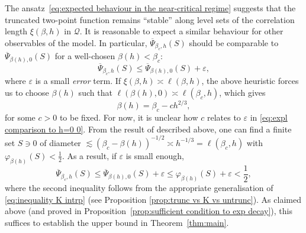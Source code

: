 \documentclass[10pt,a4paper]{amsart}
\numberwithin{equation}{section}
\begin{document}
The ansatz~\eqref{eq:expected behaviour in the near-critical regime} suggests
that the truncated two-point function remains ``stable'' along level sets of
the correlation length $\xi(\beta,h)$ in $\mathcal Q$. It is reasonable to expect a similar behaviour for other 
observables of the model. In particular, $\overline{\Psi}_{\beta_c,h}(S)$ 
should be comparable to $\overline{\Psi}_{\beta(h),0}(S)$ for a 
well-chosen $\beta(h)<\beta_c$:
\begin{equation}\label{eq:expl comparison to h=0 0}
	\overline{\Psi}_{\beta_c,h}(S)\leq \overline{\Psi}_{\beta(h),0}(S)+\varepsilon,
\end{equation}
where $\varepsilon$ is a small \emph{error} term. If $\xi(\beta,h)\asymp \ell(\beta,h)$, the above heuristic forces us to choose $\beta(h)$ such that $\ell(\beta(h),0)\asymp\ell(\beta_c,h)$, which gives
\begin{equation}
    \beta(h)=\beta_c-ch^{2/3},
\end{equation}
for some $c>0$ to be fixed. For now, it is unclear how $c$ relates to $\varepsilon$ in \eqref{eq:expl comparison to h=0 0}. From the result of \cite{DuminilPanis2024newLB} described above, one can find a finite 
set $S\ni 0$ of diameter $\lesssim(\beta_c-\beta(h))^{-1/2}\asymp h^{-1/3}=\ell(\beta_c,h)$ 
with $\varphi_{\beta(h)}(S)<\tfrac{1}{2}$. As a result, if $\varepsilon$ is small enough,
\begin{equation}\label{eq:expl comparison to h=0 1}
    \overline{\Psi}_{\beta_c,h}(S)
    \leq\overline{\Psi}_{\beta(h),0}(S)+\varepsilon
    \leq\varphi_{\beta(h)}(S)+\varepsilon
    <\frac{1}{2},
\end{equation}
where the second inequality follows from the appropriate generalisation of \eqref{eq:inequality K intrp} (see Proposition \ref{prop:trunc vs K vs untrunc}). As claimed above (and proved in 
Proposition~\ref{prop:sufficient condition to exp decay}), this suffices 
to establish the upper bound in Theorem~\ref{thm:main}.
\end{document}

